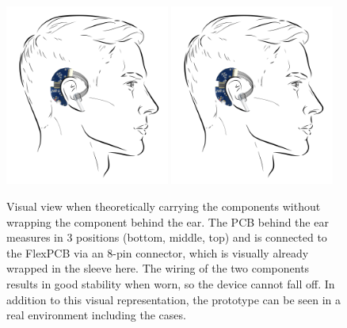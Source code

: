 \begin{figure}[t]
    \centering
    \includegraphics[width=0.48\textwidth]{thesis-doc/images/prototype/prototype_on_head_visual.png}
    \includegraphics[width=0.48\textwidth]{thesis-doc/images/prototype/prototype_on_head_visual.png}
    \caption{Visual view when theoretically carrying the components without wrapping the component behind the ear. The PCB behind the ear measures in 3 positions (bottom, middle, top) and is connected to the FlexPCB via an 8-pin connector, which is visually already wrapped in the sleeve here. The wiring of the two components results in good stability when worn, so the device cannot fall off. In addition to this visual representation, the prototype can be seen in a real environment including the cases.}
    \label{fig:design:prototype_on_head_visual}
\end{figure}

